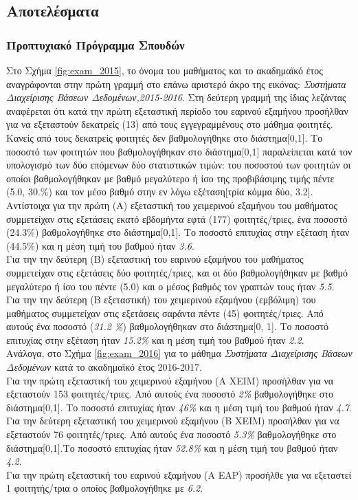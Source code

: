 \documentclass[12pt,a4paper,final]{article}
\begin{document}
\subsection{Αποτελέσματα}
\subsubsection{Προπτυχιακό Πρόγραμμα Σπουδών}

Στο Σχήμα  \ref{fig:exam_2015}, το όνομα του μαθήματος και το ακαδημαϊκό έτος  αναγράφονται στην πρώτη γραμμή στο  επάνω αριστερό άκρο της εικόνας: \textit{Συστήματα Διαχείρισης Βάσεων Δεδομένων,2015-2016}. Στη δεύτερη γραμμή της ίδιας  λεζάντας  αναφέρεται ότι κατά την πρώτη εξεταστική περίοδο του εαρινού εξαμήνου προσήλθαν για να εξεταστούν  δεκατρείς (13) από τους εγγεγραμμένους στο μάθημα φοιτητές. Κανείς από τους δεκατρείς φοιτητές δεν βαθμολογήθηκε στο διάστημα[0,1]. Το ποσοστό των φοιτητών που βαθμολογήθηκαν στο διάστημα[0,1] παραλείπεται κατά τον υπολογισμό των δύο επόμενων δύο στατιστικών τιμών: 	του ποσοστού των φοιτητών οι οποίοι βαθμολογήθηκαν με βαθμό μεγαλύτερο ή ίσο της προβιβάσιμης τιμής πέντε (5.0, 30.\%) και τον μέσο βαθμό στην εν λόγω εξέταση[τρία κόμμα δύο, 3.2].\\
Αντίστοιχα για την πρώτη (Α) εξεταστική του χειμερινού εξαμήνου του μαθήματος συμμετείχαν στις εξετάσεις  εκατό εβδομήντα εφτά (177) φοιτητές/τριες, ένα ποσοστό (24.3\%) βαθμολογήθηκε στο διάστημα[0,1]. Το ποσοστό επιτυχίας στην εξέταση ήταν (44.5\%) και η μέση τιμή του βαθμού ήταν \textit{3.6}.\\
Για την την δεύτερη (Β) εξεταστική του εαρινού εξαμήνου του μαθήματος συμμετείχαν στις εξετάσεις  δύο φοιτητές/τριες, και οι δύο βαθμολογήθηκαν με βαθμό μεγαλύτερο ή ίσο του πέντε (5.0) και ο μέσος βαθμός τον γραπτών τους ήταν \textit{5.5}.\\
Για την την δεύτερη (Β εξεταστική) του χειμερινού εξαμήνου (εμβόλιμη) του μαθήματος συμμετείχαν στις εξετάσεις σαράντα πέντε (45) φοιτητές/τριες. Από αυτούς ένα ποσοστό (\textit{31.2 \%}) βαθμολογήθηκαν στο διάστημα[0, 1]. Το ποσοστό επιτυχίας στην εξέταση ήταν \textit{15.2\%} και η μέση τιμή του βαθμού ήταν \textit{2.2}. \\
Ανάλογα, στο Σχήμα \ref{fig:exam_2016} για το μάθημα \textit{Συστήματα Διαχείρισης Βάσεων Δεδομένων} κατά το ακαδημαϊκό έτος 2016-2017.\\
Για την πρώτη εξεταστική του χειμερινού εξαμήνου (Α ΧΕΙΜ) προσήλθαν  για να εξεταστούν 153 φοιτητές/τριες. Από αυτούς ένα ποσοστό \textit{2\%} βαθμολογήθηκε στο διάστημα[0,1]. Το ποσοστό επιτυχίας ήταν \textit{46\%} και η μέση τιμή του βαθμού ήταν \textit{4.7}.\\
Για την δεύτερη  εξεταστική του χειμερινού εξαμήνου (Β ΧΕΙΜ) προσήλθαν για να εξεταστούν 76 φοιτητές/τριες. Από αυτούς ένα ποσοστό \textit{5.3\%} βαθμολογήθηκε στο διάστημα[0,1].Το ποσοστό επιτυχίας ήταν \textit{52.8\%} και η μέση τιμή του βαθμού ήταν \textit{4.2}.\\
Για την πρώτη εξεταστική του εαρινού εξαμήνου (Α ΕΑΡ) προσήλθε για να εξεταστεί 1 φοιτητής/τρια ο οποίος βαθμολογήθηκε με \textit{6.2}.\bigskip
\end{document}
